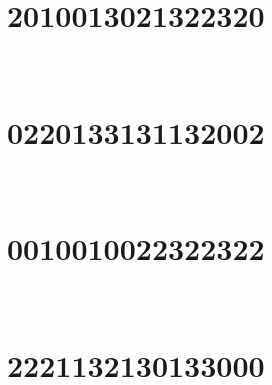 

\,
\newline
\vspace{1.2cm}

\section{2010013021322320}

\marginnote[3\baselineskip]{\centering}



\,
\newline
\vspace{1.2cm}

\section{0220133131132002}

\marginnote[3\baselineskip]{\centering}



\,
\newline
\vspace{1.2cm}

\section{0010010022322322}

\marginnote[3\baselineskip]{\centering}



\,
\newline
\vspace{1.2cm}

\section{2221132130133000}

\marginnote[3\baselineskip]{\centering}



